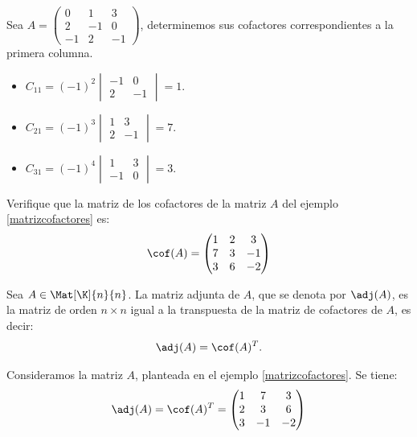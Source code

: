 \documentclass[compacto,10pt]{pubciencias-notas}
\begin{document}
\begin{ejem}\label{matrizcofactores}
    Sea $A = 
    \begin{pmatrix}
    0 & 1 & 3 \\
    2 & -1 & 0 \\
    -1 & 2 & -1
    \end{pmatrix}$, determinemos sus cofactores correspondientes a la primera columna.
    \begin{itemize}
    \item
        $C_{11} = (-1)^{2} 
        \begin{vmatrix}
            -1 & 0 \\
            2 & -1
        \end{vmatrix} = 1$.
        
    \item
        $C_{21} = (-1)^{3}
        \begin{vmatrix}
            1 & 3 \\
            2 & -1
        \end{vmatrix} = 7$.
        
    \item
        $C_{31} = (-1)^{4}
        \begin{vmatrix}
            1 & 3 \\
            -1 & 0
        \end{vmatrix} = 3$.
    \end{itemize}
\end{ejem}

\begin{ejer}
    Verifique que la matriz de los cofactores de la matriz $A$ del ejemplo \ref{matrizcofactores} es: \[ \cof(A) = 
    \begin{pmatrix}
            1 & 2 & 3\\
            7 & 3 & -1 \\
            3 & 6 & -2
        \end{pmatrix}
    \]
\end{ejer}

\begin{defi}
Sea $A\in\Mat[\K]{n}{n}$. La matriz adjunta de $A$, que se denota por $\adj(A)$, es la matriz de orden $n \times n$ igual a la transpuesta de la matriz de cofactores de $A$, es decir:
\[
    \adj(A) = \cof(A)^{T}.
\]
\end{defi}

\begin{ejem}
    Consideramos la matriz $A$, planteada en el ejemplo \ref{matrizcofactores}. Se tiene:
    \[
        \adj(A) = \cof(A)^{T} =
        \begin{pmatrix}
            1 & 7 & 3 \\
            2 & 3 & 6 \\
            3 & -1 & -2
        \end{pmatrix}
    \]
\end{ejem}
\end{document}
